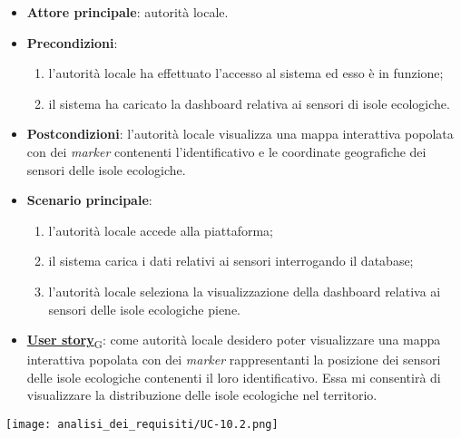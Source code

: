 \begin{itemize}
	\item \textbf{Attore principale}: autorità locale.
	\item \textbf{Precondizioni}:
	      \begin{enumerate}
		      \item l'autorità locale ha effettuato l'accesso al sistema ed esso è in funzione;
		      \item il sistema ha caricato la dashboard relativa ai sensori di isole ecologiche.
	      \end{enumerate}
	\item \textbf{Postcondizioni}: l'autorità locale visualizza una mappa interattiva popolata con dei \textit{marker} contenenti l'identificativo e le coordinate geografiche dei sensori delle isole ecologiche.
	\item \textbf{Scenario principale}:
	      \begin{enumerate}
		      \item l'autorità locale accede alla piattaforma;
		      \item il sistema carica i dati relativi ai sensori interrogando il database;
		      \item l'autorità locale seleziona la visualizzazione della dashboard relativa ai sensori delle isole ecologiche piene.
	      \end{enumerate}
	\item \href{https://7last.github.io/docs/rtb/documentazione-interna/glossario\#user-story}{\textbf{User story}\textsubscript{G}}:
	      come autorità locale desidero poter visualizzare una mappa interattiva popolata con dei \textit{marker} rappresentanti la posizione dei sensori delle isole ecologiche
	      contenenti il loro identificativo. Essa mi consentirà di visualizzare la distribuzione delle isole ecologiche nel territorio.
\end{itemize}
\begin{center}
	\texttt{[image: analisi\_dei\_requisiti/UC-10.2.png]}
\end{center}


